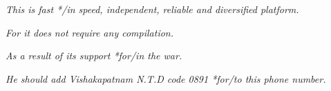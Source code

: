 \documentclass[12pt]{article}
\begin{document}
{\it This is fast */in speed, independent, reliable and diversified platform.}

{\it *For it does not require any compilation.}

{\it As a result of its support *for/in the war.}

{\it He should add Vishakapatnam N.T.D code 0891 *for/to this phone number.}





\end{document}
